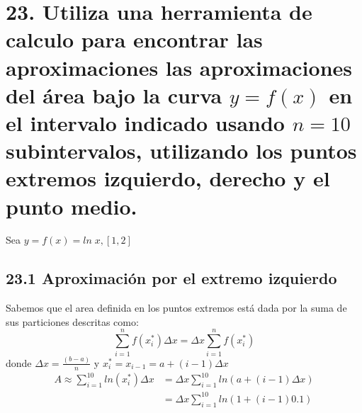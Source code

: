 \chapter*{23. Utiliza una herramienta de calculo para encontrar las aproximaciones las aproximaciones del área bajo la curva $y=f(x)$ en el intervalo indicado usando $n=10$ subintervalos, utilizando los puntos extremos izquierdo, derecho y el punto medio.}
Sea $y=f(x)=ln \;x,[1,2]$

\sectionfont{\fontsize{11}{15}\selectfont}
\indent \section*{23.1 Aproximación por el extremo izquierdo}
Sabemos que el area definida en los puntos extremos está dada por la suma de sus particiones descritas como:
\[\sum_{i=1}^{n}f(x^*_i)\Delta x=\Delta x\sum_{i=1}^{n}f(x^*_i)\]
donde $\Delta x = \frac{(b-a)}{n}$ y $x_i^*=x_{i-1}=a+(i-1)\Delta x$
\begin{align*}
	A\approx\sum_{i=1}^{10}ln(x_i^*)\Delta x & = \Delta x \sum_{i=1}^{10}ln(a+(i-1)\Delta x) \\
	                                         & =\Delta x \sum_{i=1}^{10}ln(1+(i-1)0.1)
\end{align*}
